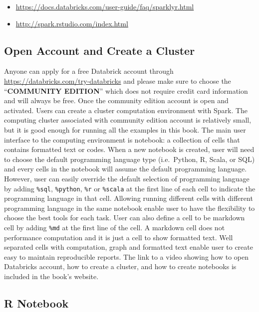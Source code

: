 \documentclass[12pt,]{krantz}
\providecommand{\tightlist}{%
  \setlength{\itemsep}{0pt}\setlength{\parskip}{0pt}}
\begin{document}
\begin{itemize}
\tightlist
\item
  \url{https://docs.databricks.com/user-guide/faq/sparklyr.html}
\item
  \url{http://spark.rstudio.com/index.html}
\end{itemize}

\hypertarget{open-account-and-create-a-cluster}{%
\subsection{Open Account and Create a Cluster}\label{open-account-and-create-a-cluster}}

Anyone can apply for a free Databrick account through \url{https://databricks.com/try-databricks} and please make sure to choose the ``\textbf{COMMUNITY EDITION}'' which does not require credit card information and will always be free. Once the community edition account is open and activated. Users can create a cluster computation environment with Spark. The computing cluster associated with community edition account is relatively small, but it is good enough for running all the examples in this book. The main user interface to the computing environment is notebook: a collection of cells that contains formatted text or codes. When a new notebook is created, user will need to choose the default programming language type (i.e.~Python, R, Scala, or SQL) and every cells in the notebook will assume the default programming language. However, user can easily override the default selection of programming language by adding \texttt{\%sql}, \texttt{\%python}, \texttt{\%r} or \texttt{\%scala} at the first line of each cell to indicate the programming language in that cell. Allowing running different cells with different programming language in the same notebook enable user to have the flexibility to choose the best tools for each task. User can also define a cell to be markdown cell by adding \texttt{\%md} at the first line of the cell. A markdown cell does not performance computation and it is just a cell to show formatted text. Well separated cells with computation, graph and formatted text enable user to create easy to maintain reproducible reports. The link to a video showing how to open Databricks account, how to create a cluster, and how to create notebooks is included in the book's website.

\hypertarget{r-notebook}{%
\subsection{R Notebook}\label{r-notebook}}
\end{document}
